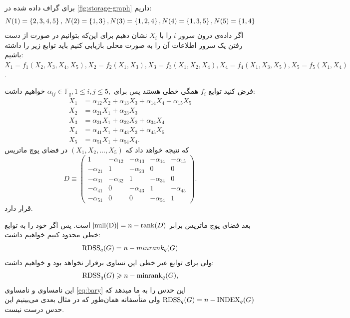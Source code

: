  \begin{example}
 	برای گراف داده شده در
 	\autoref{fig:storage-graph}
 	داریم:
 	$$
 		N(1) = \left\{ 2,3,4,5 \right\}, \, N(2)  = \left\{ 1,3 \right\}, N(3)  = \left\{ 1,2,4 \right\}, N(4)  = \left\{ 1,3,5 \right\},  N(5)  = \left\{ 1,4 \right\}
 	$$
 	اگر داده‌ی درون سرور
 	$i$
 	را با
 	$X_i$
 	نشان دهیم برای این‌که بتوانیم در صورت از دست رفتن یک سرور اطلاعات آن را به صورت محلی بازیابی کنیم باید توابع زیر را داشته باشیم: 	
 	$X_1 = f_1(X_2,X_3,X_4,X_5), X_2 = f_2(X_1,X_3), X_3 = f_3(X_1,X_2,X_4), X_4 = f_4(X_1,X_3, X_5), X_5 = f_5(X_1, X_4)$.

 	فرض کنید توابع
 	$f_i$
 	همگی خطی هستند پس برای
 	$\alpha_{ij} \in  \mathbb{F}_q, 1\le i,j\le 5,$
 	خواهیم داشت:
 	 	\begin{align*}
 		X_1 &= \alpha_{12} X_2 +\alpha_{13} X_3 + \alpha_{14}X_4 + \alpha_{15}X_5\\
 		X_2 &= \alpha_{21}X_1+\alpha_{23}X_3\\
 		X_3 &= \alpha_{31}X_1 +\alpha_{32}X_2+\alpha_{34}X_4\\
 		X_4 &= \alpha_{41}X_1 + \alpha_{43}X_3 + \alpha_{45}X_5\\
 		X_5 &= \alpha_{51}X_1+\alpha_{54}X_4.
 	\end{align*}
 	که نتیجه خواهد داد که
 	$(X_1,X_2,\dots, X_5)$
 	در فضای پوچ ماتریس
 	\[
 	D \equiv
 	\left( \begin{array}{ccccc}
 		1 & -\alpha_{12} & -\alpha_{13}  & - \alpha_{14} & -\alpha_{15} \\
 		-\alpha_{21} & 1 &  -\alpha_{23} & 0 & 0 \\
 		-\alpha_{31} & -\alpha_{32} & 1 & -\alpha_{34} & 0\\
 		-\alpha_{41} & 0 &-\alpha_{43}  & 1 & -\alpha_{45}\\
 		-\alpha_{51} &0 & 0 & -\alpha_{54} & 1
 	\end{array} \right).\] 
 	قرار دارد.
 	
 	بعد فضای پوچ ماتریس برابر
 	$\left|{\rm{null}(D)}\right| = n - \operatorname{rank}(D)$
 	است. پس اگر خود را به توابع خطی محدود کنیم خواهیم داشت:
 	$$\mathrm{RDSS}_q(G) = n - minrank_q(G)$$
 	ولی برای توابع غیر خطی این تساوی برقرار نخواهد بود و خواهیم داشت:
 	\begin{equation}
 		\mathrm{RDSS}_q(G) \geqslant n - \mathrm{minrank}_q(G),
 		\label{eq:minrk}
 	\end{equation}
 	این نامساوی و نامساوی
 	\autoref{eq:bary}
 	این حدس را به ما میدهد که
 	$\mathrm{RDSS}_q(G) = n - \mathrm{INDEX}_q(G)$
 	ولی متأسفانه همان‌طور که در مثال بعدی می‌بینیم این حدس درست نیست.
 \end{example}
 

